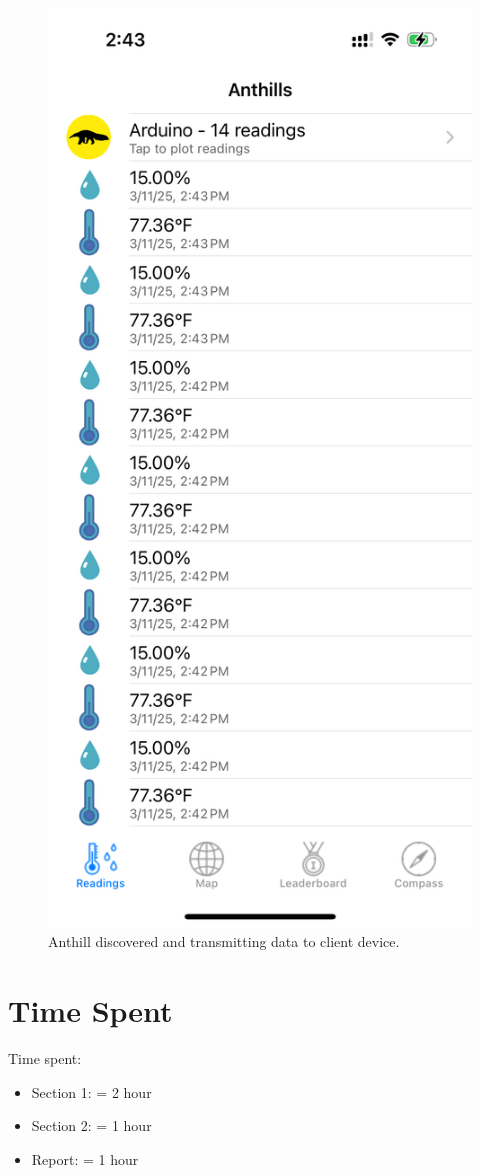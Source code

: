 \documentclass{lab}
\begin{document}
\begin{figure}[h]
    \begin{center}
    \includegraphics[height=0.35\textheight]{images/anthill.png} 
    \caption{Anthill discovered and transmitting data to client device.}
    \end{center}
\end{figure}

\newpage

\section{Time Spent} 

Time spent:

\begin{itemize}
  \item Section 1: = 2 hour
  \item Section 2: = 1 hour
  \item Report: = 1 hour
\end{itemize}
\end{document}
